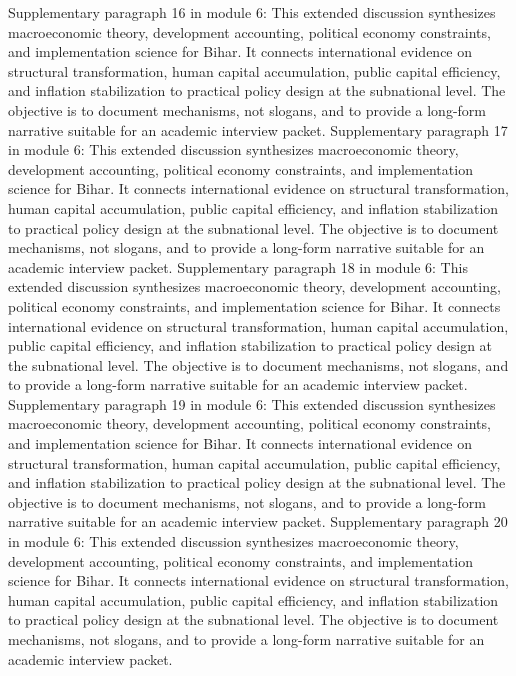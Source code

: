 \documentclass[preprint,12pt]{elsarticle}
\begin{document}
Supplementary paragraph 16 in module 6: This extended discussion synthesizes macroeconomic theory, development accounting, political economy constraints, and implementation science for Bihar. It connects international evidence on structural transformation, human capital accumulation, public capital efficiency, and inflation stabilization to practical policy design at the subnational level. The objective is to document mechanisms, not slogans, and to provide a long-form narrative suitable for an academic interview packet.
Supplementary paragraph 17 in module 6: This extended discussion synthesizes macroeconomic theory, development accounting, political economy constraints, and implementation science for Bihar. It connects international evidence on structural transformation, human capital accumulation, public capital efficiency, and inflation stabilization to practical policy design at the subnational level. The objective is to document mechanisms, not slogans, and to provide a long-form narrative suitable for an academic interview packet.
Supplementary paragraph 18 in module 6: This extended discussion synthesizes macroeconomic theory, development accounting, political economy constraints, and implementation science for Bihar. It connects international evidence on structural transformation, human capital accumulation, public capital efficiency, and inflation stabilization to practical policy design at the subnational level. The objective is to document mechanisms, not slogans, and to provide a long-form narrative suitable for an academic interview packet.
Supplementary paragraph 19 in module 6: This extended discussion synthesizes macroeconomic theory, development accounting, political economy constraints, and implementation science for Bihar. It connects international evidence on structural transformation, human capital accumulation, public capital efficiency, and inflation stabilization to practical policy design at the subnational level. The objective is to document mechanisms, not slogans, and to provide a long-form narrative suitable for an academic interview packet.
Supplementary paragraph 20 in module 6: This extended discussion synthesizes macroeconomic theory, development accounting, political economy constraints, and implementation science for Bihar. It connects international evidence on structural transformation, human capital accumulation, public capital efficiency, and inflation stabilization to practical policy design at the subnational level. The objective is to document mechanisms, not slogans, and to provide a long-form narrative suitable for an academic interview packet.
\end{document}
